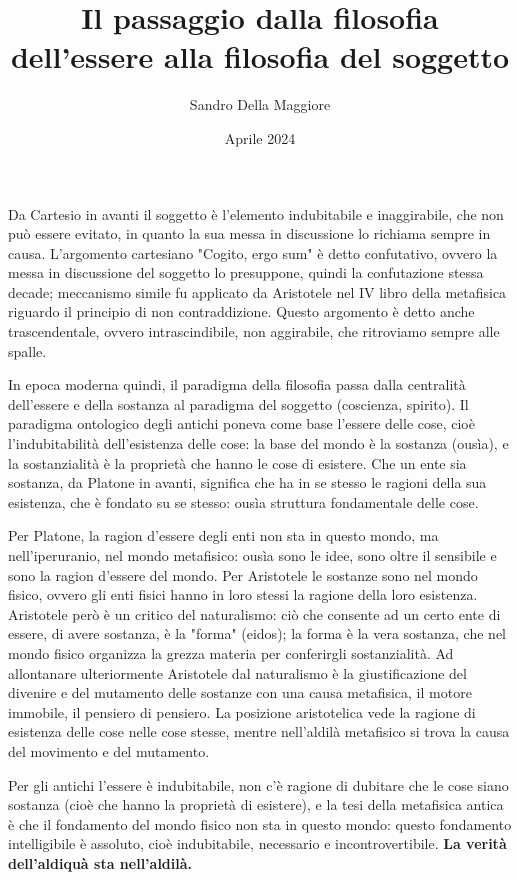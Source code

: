 \documentclass[a4paper,12pt,oneside]{article}%
\begin{document}
	\author{Sandro Della Maggiore}
	\title{Il passaggio dalla filosofia dell'essere alla filosofia del soggetto}
	\date{Aprile 2024}
	
	\maketitle

Da Cartesio in avanti il soggetto è l'elemento indubitabile e inaggirabile, che non può essere evitato, in quanto la sua messa in discussione lo richiama sempre in causa. L'argomento cartesiano "Cogito, ergo sum" è detto confutativo, ovvero la messa in discussione del soggetto lo presuppone, quindi la confutazione stessa decade; meccanismo simile fu applicato da Aristotele nel IV libro della metafisica riguardo il principio di non contraddizione. Questo argomento è detto anche trascendentale, ovvero intrascindibile, non aggirabile, che ritroviamo sempre alle spalle.

In epoca moderna quindi, il paradigma della filosofia passa dalla centralità dell'essere e della sostanza al paradigma del soggetto (coscienza, spirito). Il paradigma ontologico degli antichi poneva come base l'essere delle cose, cioè l'indubitabilità dell'esistenza delle cose: la base del mondo è la sostanza (ousìa), e la sostanzialità è la proprietà che hanno le cose di esistere. Che un ente sia sostanza, da Platone in avanti, significa che ha in se stesso le ragioni della sua esistenza, che è fondato su se stesso: ousìa struttura fondamentale delle cose.

Per Platone, la ragion d'essere degli enti non sta in questo mondo, ma nell'iperuranio, nel mondo metafisico: ousìa sono le idee, sono oltre il sensibile e sono la ragion d'essere del mondo. Per Aristotele le sostanze sono nel mondo fisico, ovvero gli enti fisici hanno in loro stessi la ragione della loro esistenza. Aristotele però è un critico del naturalismo: ciò che consente ad un certo ente di essere, di avere sostanza, è la "forma" (eidos); la forma è la vera sostanza, che nel mondo fisico organizza la grezza materia per conferirgli sostanzialità. Ad allontanare ulteriormente Aristotele dal naturalismo è la giustificazione del divenire e del mutamento delle sostanze con una causa metafisica, il motore immobile, il pensiero di pensiero. La posizione aristotelica vede la ragione di esistenza delle cose nelle cose stesse, mentre nell'aldilà metafisico si trova la causa del movimento e del mutamento.

Per gli antichi l'essere è indubitabile, non c'è ragione di dubitare che le cose siano sostanza (cioè che hanno la proprietà di esistere), e la tesi della metafisica antica è che il fondamento del mondo fisico non sta in questo mondo: questo fondamento intelligibile è assoluto, cioè indubitabile, necessario e incontrovertibile. \textbf{La verità dell'aldiquà sta nell'aldilà.}
\end{document}
